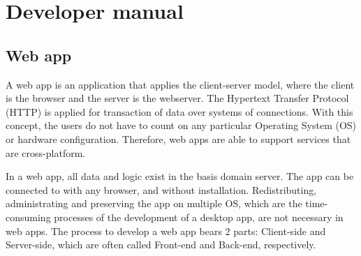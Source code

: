 \documentclass[a4paper, 11pt,openany]{book} %
\begin{document}
\begin{usecase}

\end{usecase}

\chapter{Developer manual}
\section{Web app}
A web app is an application that applies the client-server model, where the client is the browser and the server is the webserver. The Hypertext Transfer Protocol (HTTP) is applied for transaction of data over systems of connections. With this concept, the users do not have to count on any particular Operating System (OS) or hardware configuration. Therefore, web apps are able to support services that are cross-platform.\par
In a web app, all data and logic exist in the basis domain server. The app can be connected to with any browser, and without installation. Redistributing, administrating and preserving the app on multiple OS, which are the time-consuming processes of the development of a desktop app, are not necessary in web apps. The process to develop a web app bears 2 parts: Client-side and Server-side, which are often called Front-end and Back-end, respectively.
\end{document}
